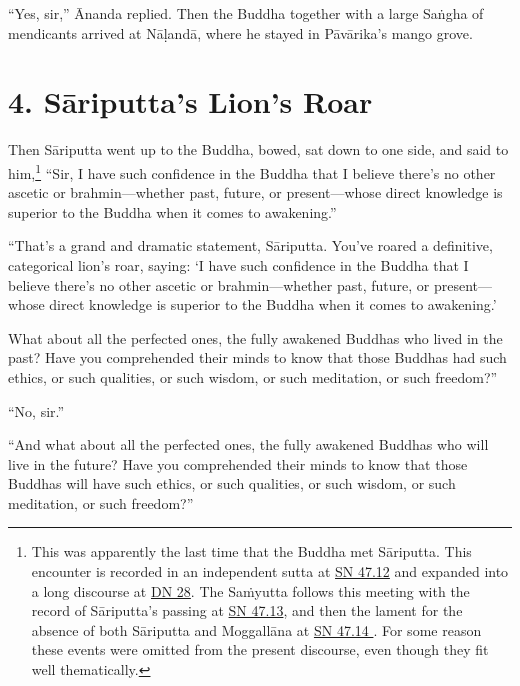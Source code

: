 \documentclass[12pt,openany]{book}%
\begin{document}
“Yes, sir,” Ānanda replied. Then the Buddha together with a large \textsanskrit{Saṅgha} of mendicants arrived at \textsanskrit{Nāḷandā}, where he stayed in \textsanskrit{Pāvārika}’s mango grove. 

\section*{4. \textsanskrit{Sāriputta}’s Lion’s Roar }

Then \textsanskrit{Sāriputta} went up to the Buddha, bowed, sat down to one side, and said to him,\footnote{This was apparently the last time that the Buddha met \textsanskrit{Sāriputta}. This encounter is recorded in an independent sutta at \href{https://suttacentral.net/sn47.12/en/sujato}{SN 47.12} and expanded into a long discourse at \href{https://suttacentral.net/dn28/en/sujato}{DN 28}. The \textsanskrit{Saṁyutta} follows this meeting with the record of \textsanskrit{Sāriputta}’s passing at \href{https://suttacentral.net/sn47.13/en/sujato}{SN 47.13}, and then the lament for the absence of both \textsanskrit{Sāriputta} and \textsanskrit{Moggallāna} at \href{https://suttacentral.net/sn47.14 /en/sujato}{SN 47.14 }. For some reason these events were omitted from the present discourse, even though they fit well thematically. } “Sir, I have such confidence in the Buddha that I believe there’s no other ascetic or brahmin—whether past, future, or present—whose direct knowledge is superior to the Buddha when it comes to awakening.” 

“That’s a grand and dramatic statement, \textsanskrit{Sāriputta}. You’ve roared a definitive, categorical lion’s roar, saying: ‘I have such confidence in the Buddha that I believe there’s no other ascetic or brahmin—whether past, future, or present—whose direct knowledge is superior to the Buddha when it comes to awakening.’ 

What about all the perfected ones, the fully awakened Buddhas who lived in the past? Have you comprehended their minds to know that those Buddhas had such ethics, or such qualities, or such wisdom, or such meditation, or such freedom?” 

“No, sir.” 

“And what about all the perfected ones, the fully awakened Buddhas who will live in the future? Have you comprehended their minds to know that those Buddhas will have such ethics, or such qualities, or such wisdom, or such meditation, or such freedom?” 
\end{document}
